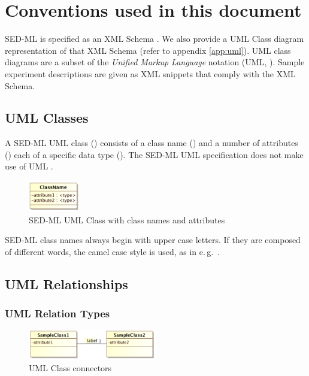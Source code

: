 \section{Conventions used in this document}
\label{sec:conventions}

SED-ML is specified as an XML Schema \citep{xmls}. We also provide a UML Class diagram representation of that XML Schema (refer to appendix \ref{app:uml}). UML class diagrams are a subset of the \emph{Unified Markup Language} notation (UML, \citep{uml22}). Sample experiment descriptions are given as XML snippets that comply with the XML Schema.

\subsection{UML Classes}
\label{sec:umlconventions}
A SED-ML UML class () consists of a class name () and a number of attributes () each of a specific data type (). The SED-ML UML specification does not make use of UML .
\begin{figure}[h]
\centering
\includegraphics[width=0.2\textwidth]{images/uml/umlClass.png}
\caption{SED-ML UML Class with class names and attributes}
\label{fig:umlClass}
\end{figure}

SED-ML class names always begin with upper case letters. If they are composed of different words, the camel case style is used, as in e.\,g.\ .

\subsection{UML Relationships}
\subsubsection{UML Relation Types}
\begin{figure}[h]
\centering
\includegraphics[width=0.5\textwidth]{images/uml/classRelation.png}
\caption{UML Class connectors}
\label{fig:umlConnectors}
\end{figure}

